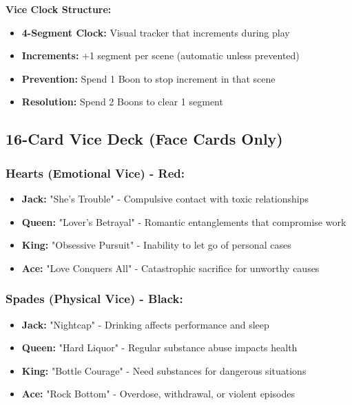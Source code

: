 \documentclass[11pt]{article}
\begin{document}
\textbf{Vice Clock Structure:}
\begin{itemize}
    \item \textbf{4-Segment Clock:} Visual tracker that increments during play
    \item \textbf{Increments:} +1 segment per scene (automatic unless prevented)
    \item \textbf{Prevention:} Spend 1 Boon to stop increment in that scene
    \item \textbf{Resolution:} Spend 2 Boons to clear 1 segment
\end{itemize}

\subsection{16-Card Vice Deck (Face Cards Only)}

\subsubsection{Hearts (Emotional Vice) - Red:}
\begin{itemize}
    \item \textbf{Jack:} "She's Trouble" - Compulsive contact with toxic relationships
    \item \textbf{Queen:} "Lover's Betrayal" - Romantic entanglements that compromise work
    \item \textbf{King:} "Obsessive Pursuit" - Inability to let go of personal cases
    \item \textbf{Ace:} "Love Conquers All" - Catastrophic sacrifice for unworthy causes
\end{itemize}

\subsubsection{Spades (Physical Vice) - Black:}
\begin{itemize}
    \item \textbf{Jack:} "Nightcap" - Drinking affects performance and sleep
    \item \textbf{Queen:} "Hard Liquor" - Regular substance abuse impacts health
    \item \textbf{King:} "Bottle Courage" - Need substances for dangerous situations
    \item \textbf{Ace:} "Rock Bottom" - Overdose, withdrawal, or violent episodes
\end{itemize}
\end{document}
